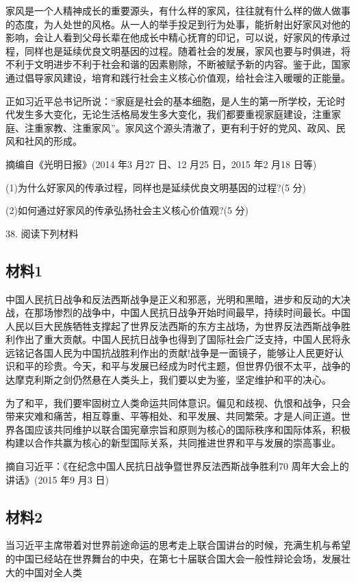 \documentclass[UTF8,11pt]{ctexart}
\begin{document}
家风是一个人精神成长的重要源头，有什么样的家风，往往就有什么样的做人做事的态度，为人处世的风格。从一人的举手投足到行为处事，能折射出好家风对他的影响，会让人看到父母长辈在他成长中精心抚育的印记，可以说，好家风的传承过程，同样也是延续优良文明基因的过程。随着社会的发展，家风也要与时俱进，将不利于文明进步不利于社会和谐的因素剔除，不断被赋予新的内容。鉴于此，国家通过倡导家风建设，培育和践行社会主义核心价值观，给社会注入暖暖的正能量。

正如习近平总书记所说：“家庭是社会的基本细胞，是人生的第一所学校，无论时代发生多大变化，无论生活格局发生多大变化，我们都要重视家庭建设，注重家庭、注重家教、注重家风”。家风这个源头清澈了，更有利于好的党风、政风、民风和社风的形成。

摘编自《光明日报》(2014 年3 月27 日、12 月25 日，2015 年2 月18 日等)

(1)为什么好家风的传承过程，同样也是延续优良文明基因的过程?(5 分)


(2)如何通过好家风的传承弘扬社会主义核心价值观?(5 分)


38. 阅读下列材料


\subsection*{材料1}

中国人民抗日战争和反法西斯战争是正义和邪恶，光明和黑暗，进步和反动的大决战，在那场惨烈的战争中，中国人民抗日战争开始时间最早，持续时间最长。中国人民以巨大民族牺牲支撑起了世界反法西斯的东方主战场，为世界反法西斯战争胜利作出了重大贡献。中国人民抗日战争也得到了国际社会广泛支持，中国人民将永远铭记各国人民为中国抗战胜利作出的贡献!战争是一面镜子，能够让人民更好认识和平的珍贵。今天，和平与发展已经成为时代主题，但世界仍很不太平，战争的达摩克利斯之剑仍然悬在人类头上，我们要以史为鉴，坚定维护和平的决心。

为了和平，我们要牢固树立人类命运共同体意识。偏见和歧视、仇恨和战争，只会带来灾难和痛苦，相互尊重、平等相处、和平发展、共同繁荣。才是人间正道。世界各国应该共同维护以联合国宪章宗旨和原则为核心的国际秩序和国际体系，积极构建以合作共赢为核心的新型国际关系，共同推进世界和平与发展的崇高事业。

摘自习近平：《在纪念中国人民抗日战争暨世界反法西斯战争胜利70 周年大会上的讲话》(2015 年9 月3 日)

\subsection*{材料2}

当习近平主席带着对世界前途命运的思考走上联合国讲台的时候，充满生机与希望的中国已经站在世界舞台的中央，在第七十届联合国大会一般性辩论会场，发展壮大的中国对全人类
\end{document}
